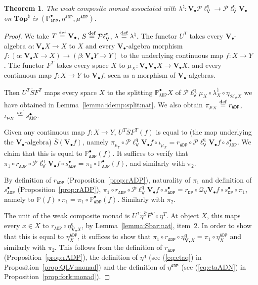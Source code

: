 \documentclass[preprint,12pt]{elsarticle}
\newcommand\eqdef{\mathrel{\buildrel \text{def}\over=}}
\newcommand\Pred{\mathbb{P}}
\newcommand\Angel{{\mathtt{A}}}
\newcommand\Demon{{\mathtt{D}}}
\newcommand\Nature{{\mathtt{P}}}
\newcommand\DN{{\Demon\Nature}}
\newcommand\ADN{{\Angel\Demon\Nature}}
\newcommand\Smyth{{\mathcal Q}}
\newcommand\Hoare{{\mathcal H}}
\newcommand\Vt{\mathsf{V}}
\newcommand\HV{\Hoare_\Vt}
\newcommand\SV{\Smyth_{\Vt}}
\newcommand\quasi{\mathrm{q}} %
\newcommand\QL{\Plotkin^\quasi}
\newcommand\QLV{\QL_\Vt}
\newcommand\Plotkin{\mathcal P\ell} %
\newcommand\Val{{\mathbf V}}
\newcommand\Topcat{\mathbf{Top}}
\newtheorem{theorem}{Theorem}[section]
\begin{document}
\begin{theorem}
  \label{thm:weaklift:nat}
  The weak composite monad associated with
  $\lambda^\natural \colon \Val_\bullet {\QLV} \to \QLV
  {\Val_\bullet}$ on $\Topcat^\natural$ is
  $(\Pred_\ADN^\bullet, \eta^\ADN, \mu^\ADN)$.
\end{theorem}
\begin{proof}
  We take $T \eqdef \Val_\bullet$, $S \eqdef \QLV$,
  $\lambda \eqdef \lambda^\natural$.  The functor $U^T$ takes every
  $\Val_\bullet$-algebra $\alpha \colon \Val_\bullet X \to X$ to $X$
  and every $\Val_\bullet$-algebra morphism
  $f \colon (\alpha \colon \Val_\bullet X \to X) \to (\beta \colon
  \Val_\bullet Y \to Y)$ to the underlying continuous map
  $f \colon X \to Y$.  The functor $F^T$ takes every space $X$ to
  $\mu_X \colon \Val_\bullet {\Val_\bullet X} \to \Val_\bullet X$, and
  every continuous map $f \colon X \to Y$ to $\Val_\bullet f$, seen as
  a morphism of $\Val_\bullet$-algebras.

  Then $U^T \overline S F^T$ maps every space $X$ to the splitting
  $\Pred_\ADN^\bullet X$ of
  $\QLV {\mu_X} \circ {\lambda^\natural_X} \circ \eta_{\HV X}$ we have
  obtained in Lemma~\ref{lemma:idemp:split:nat}.  We also obtain
  $\pi_{\mu_X} \eqdef r_\ADN$, $\iota_{\mu_X} \eqdef s_\ADN^\bullet$.
  
  Given any continuous map $f \colon X \to Y$,
  $U^T \overline S F^T (f)$ is equal to (the map underlying the
  $\Val_\bullet$-algebra) $\overline S (\Val_\bullet f)$, namely
  $\pi_{\mu_Y} \circ \QLV {\Val_\bullet f} \circ \iota_{\mu_X} =
  r_\ADN \circ \QLV {\Val_\bullet f} \circ s_\ADN^\bullet$.  We claim
  that this is equal to $\Pred_\ADN^\bullet (f)$.  It suffices to
  verify that
  $\pi_1 \circ r_\ADN \circ \QLV {\Val_\bullet f} \circ s_\ADN^\bullet
  = \pi_1 \circ \Pred_\ADN^\bullet (f)$, and similarly with $\pi_2$.

  By definition of $r_\ADN$ (Proposition~\ref{prop:rADP}), naturality
  of $\pi_1$ and definition of $s_\ADN^\bullet$
  (Proposition~\ref{prop:rADP}),
  $\pi_1 \circ r_\ADN \circ \QLV {\Val_\bullet f} \circ s_\ADN^\bullet
  = r_\DN \circ \SV {\Val_\bullet f} \circ s_\DN^\bullet \circ \pi_1$,
  namely to
  $\Pred (f) \circ \pi_1 = \pi_1 \circ \Pred_\ADN^\bullet (f)$.
  Similarly with $\pi_2$.

  The unit of the weak composite monad is
  $U^T \eta^{\overline S} F^T \circ \eta^T$.  At object $X$, this maps
  every $x \in X$ to $r_\ADN \circ \eta^\quasi_{\Val_\bullet X}$, by
  Lemma~\ref{lemma:Sbar:nat}, item~2.  In order to show that this is
  equal to $\eta^\ADN_X$, it suffices to show that
  $\pi_1 \circ r_\ADN \circ \eta^\quasi_{\Val_\bullet X} = \pi_1 \circ
  \eta^\ADN_X$ and similarly with $\pi_2$.  This follows from the
  definition of $r_\ADN$ (Proposition~\ref{prop:rADP}), the definition
  of $\eta^\quasi$ (see (\ref{eq:etaq}) in
  Proposition~\ref{prop:QLV:monad}) and the definition of $\eta^\ADN$
  (see (\ref{eq:etaADN}) in Proposition~\ref{prop:fork:monad}).


\end{proof}
\end{document}
